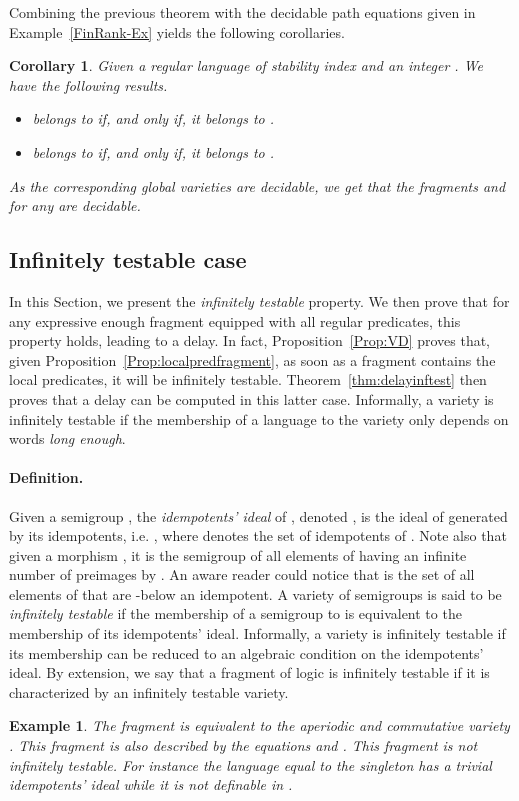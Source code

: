 \documentclass[submission,hidelink]{dmtcs-episciences}
\newtheorem{corollary}[theorem]{Corollary}
\newtheorem{example}{Example}
\begin{document}
		Combining the previous theorem with the decidable path equations given in Example~\ref{FinRank-Ex} yields the following corollaries.

		\begin{corollary}\label{FinRank-CorDecid}
		Given a regular language  of stability index  and an integer . We have the following results.
		\begin{itemize}
			\item   belongs to  if, and only if, it belongs to
		.
			\item  belongs to  if, and only if, it belongs to	 .
		\end{itemize}

		As the corresponding global varieties are decidable, we get that the fragments  and  for any  are decidable.
		\end{corollary}





\subsection{Infinitely testable case}\label{SsSection:InfTest}
	In this Section, we present the \emph{infinitely testable} property.
	We then prove that for any expressive enough fragment equipped with all regular predicates, this property holds, leading to a delay.
	In fact, Proposition~\ref{Prop:VD} proves that, given Proposition~\ref{Prop:localpredfragment}, as soon as a fragment contains the local predicates, it will be infinitely testable.
	Theorem~\ref{thm:delayinftest} then proves that a delay can be computed in this latter case.
	Informally, a variety is infinitely testable if the membership of a language
	to the variety only depends on words \emph{long enough}.
	\paragraph{Definition.}

	Given a semigroup , the \emph{idempotents' ideal} of , denoted ,
	is the ideal of  generated by its idempotents, i.e. , where  denotes the set of idempotents of .
	Note also that given a morphism
	 , it is the semigroup
	of all elements of  having an infinite number of preimages by .
	An aware reader could notice that  is the set of all elements of  that
	are -below an idempotent.
	A variety of semigroups  is said to be \emph{infinitely testable}
	if the membership of a semigroup to  is equivalent to
	the membership of its idempotents' ideal.
	Informally, a variety is infinitely testable if its membership
	can be reduced to an algebraic condition on the idempotents' ideal.
	By extension, we say that a fragment of logic is infinitely testable if
	it is characterized by an infinitely testable variety.
	\begin{example}
	The fragment  is equivalent to the
	aperiodic and commutative variety . This fragment is also described by the equations
	 and . This fragment is not infinitely
	testable. For instance the language equal to the singleton  has a trivial idempotents' ideal while it is
	not
	definable in .
	\end{example}
\end{document}
